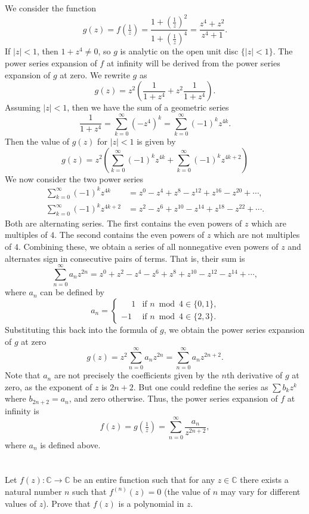 \documentclass[12pt]{article}
\newenvironment{problem}
    {\begin{lrbox}{\mybox}\begin{minipage}{0.98\textwidth}}
    {\end{minipage}\end{lrbox}\framebox[\textwidth]{\usebox{\mybox}}}
\newcommand{\C}{\mathbb{C}}
\begin{document}
We consider the function
\[
    g(z) 
        = f\!\left(\tfrac1z\right) 
        = \frac{1 + \left(\frac1z\right)^2}{1 + \left(\frac1z\right)^4}
        = \frac{z^4 + z^2}{z^4 + 1}.
\]
If $|z| < 1$, then $1 + z^4 \ne 0$, so $g$ is analytic on the open unit disc $\{|z| < 1\}$. The power series expansion of $f$ at infinity will be derived from the power series expansion of $g$ at zero. We rewrite $g$ as
\[
    g(z) = z^2 \left( \frac{1}{1 + z^4} + z^2 \frac{1}{1 + z^4} \right).
\]
Assuming $|z| < 1$, then we have the sum of a geometric series
\[
    \frac{1}{1 + z^4} = \sum_{k=0}^\infty (-z^4)^k = \sum_{k=0}^\infty (-1)^k z^{4k}.
\]
Then the value of $g(z)$ for $|z| < 1$ is given by
\[
    g(z) = z^2 \left( \sum_{k=0}^\infty (-1)^k z^{4k} + \sum_{k=0}^\infty (-1)^k z^{4k + 2} \right)
\]
We now consider the two power series
\begin{align*}
    \sum_{k=0}^\infty (-1)^k z^{4k} &= z^0 - z^4 + z^8 - z^{12} + z^{16} - z^{20} + \cdots, \\
    \sum_{k=0}^\infty (-1)^k z^{4k + 2} &= z^2 - z^6 + z^{10} - z^{14} + z^{18} - z^{22} + \cdots.
\end{align*}
Both are alternating series. The first contains the even powers of $z$ which are multiples of $4$. The second contains the even powers of $z$ which are not multiples of $4$. Combining these, we obtain a series of all nonnegative even powers of $z$ and alternates sign in consecutive pairs of terms. That is, their sum is
\[
    \sum_{n=0}^\infty a_n z^{2n} = z^0 + z^2 - z^4 - z^6 + z^8 + z^{10} - z^{12} - z^{14} + \cdots,
\]
where $a_n$ can be defined by
\[
    a_n = \begin{cases}
        \phantom{-}1 & \text{if $n \bmod 4 \in \{0,1\}$,} \\
        -1 & \text{if $n \bmod 4 \in \{2,3\}$.} 
    \end{cases}
\]
Substituting this back into the formula of $g$, we obtain the power series expansion of $g$ at zero
\[
    g(z) = z^2 \sum_{n=0}^\infty a_n z^{2n} = \sum_{n=0}^\infty a_n z^{2n + 2}.
\]
Note that $a_n$ are not precisely the coefficients given by the $n$th derivative of $g$ at zero, as the exponent of $z$ is $2n +2$. But one could redefine the series as $\sum b_k z^k$ where $b_{2n + 2} = a_n$, and zero otherwise. Thus, the power series expansion of $f$ at infinity is
\[
    f(z) = g\!\left(\tfrac1z\right) = \sum_{n=0}^\infty \frac{a_n}{z^{2n + 2}},
\]
where $a_n$ is defined above.

\newpage
\section{}
\begin{problem}
    Let $f(z) : \C \to \C$ be an entire function such that for any $z \in \C$ there exists a natural number $n$ such that $f^{(n)}(z) = 0$ (the value of $n$ may vary for different values of $z$). Prove that $f(z)$ is a polynomial in $z$.
\end{problem}
\end{document}
